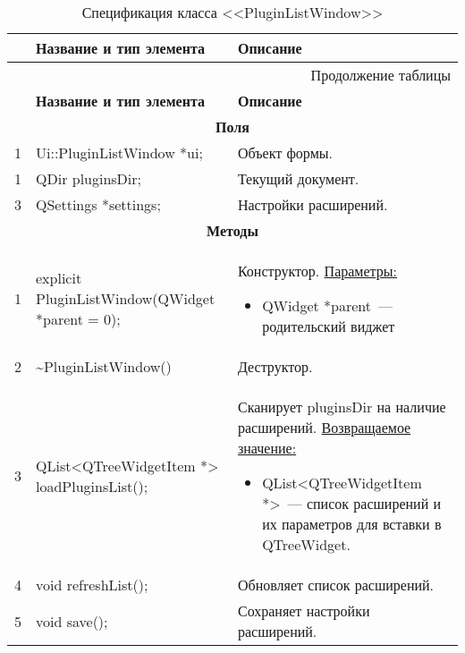 \small
\singlespacing
\begin{longtable}[h]{|p{}|p{}|p{}|}
  \caption{Спецификация класса <<PluginListWindow>>}
	\\ \hline
	  \textbf{\No}                  &
	  \textbf{Название и тип элемента}  &
	  \textbf{Описание}
	\\ \hline
  \endfirsthead

  \multicolumn{3}{r}{Продолжение таблицы \thetable{}}
  \\ \hline
	  \textbf{\No}                  &
	  \textbf{Название и тип элемента}  &
	  \textbf{Описание}
	\\ \hline
  \endhead

  \multicolumn{3}{|c|}{\textbf{Поля}} \\
  \hline
  1 & Ui::PluginListWindow *ui; & Объект формы. \\ \hline
  1 & QDir pluginsDir; & Текущий документ. \\ \hline
  3 & QSettings *settings; & Настройки расширений. \\ \hline

  \multicolumn{3}{|c|}{\textbf{Методы}} \\
  \hline
  1 & explicit PluginListWindow(QWidget *parent = 0); &
    Конструктор.\newline
    \uline{Параметры:}
    \begin{itemize}[nolistsep,label=,leftmargin=0cm]
      \item QWidget *parent~--- родительский виджет
    \end{itemize}\\ \hline
  2 & \textasciitilde PluginListWindow() & Деструктор. \\ \hline
  3 & QList<QTreeWidgetItem *> loadPluginsList(); &
    Сканирует pluginsDir на наличие расширений.\newline
    \uline{Возвращаемое значение:}
    \begin{itemize}[nolistsep,label=,leftmargin=0cm]
      \item QList<QTreeWidgetItem *>~--- список расширений и их параметров для вставки в QTreeWidget.
    \end{itemize} \\ \hline
  4 & void refreshList(); & Обновляет список расширений. \\ \hline
  5 & void save(); & Сохраняет настройки расширений. \\ \hline
\end{longtable}
\normalsize
\onehalfspacing


